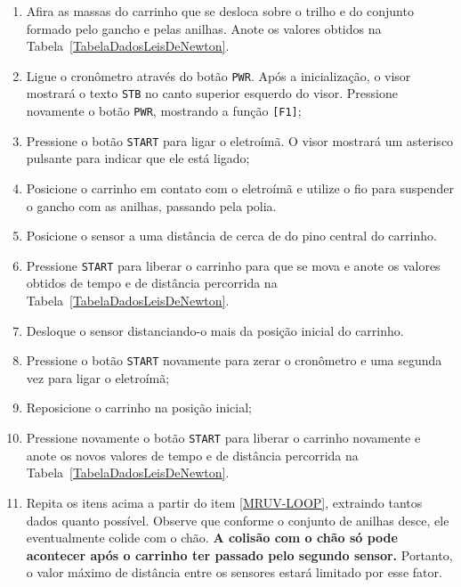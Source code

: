 \begin{enumerate}
	\item Afira as massas do carrinho que se desloca sobre o trilho e do conjunto formado pelo gancho e pelas anilhas. Anote os valores obtidos na Tabela~\ref{TabelaDadosLeisDeNewton}.
	    \item Ligue o cronômetro através do botão \texttt{PWR}. Após a inicialização, o visor mostrará o texto \texttt{STB} no canto superior esquerdo do visor. Pressione novamente o botão \texttt{PWR}, mostrando a função \texttt{[F1]};
    \item Pressione o botão \texttt{START} para ligar o eletroímã. O visor mostrará um asterisco pulsante para indicar que ele está ligado;
    \item Posicione o carrinho em contato com o eletroímã e utilize o fio para suspender o gancho com as anilhas, passando pela polia.
	\item Posicione o sensor a uma distância de cerca de  do pino central do carrinho.
	\item Pressione \texttt{START} para liberar o carrinho para que se mova e anote os valores obtidos de tempo e de distância percorrida na Tabela~\ref{TabelaDadosLeisDeNewton}.
	\item Desloque o sensor distanciando-o mais  da posição inicial do carrinho. \label{MRUV-LOOP}
	\item Pressione o botão \texttt{START} novamente para zerar o cronômetro e uma segunda vez para ligar o eletroímã;
	\item Reposicione o carrinho na posição inicial; 
	\item Pressione novamente o botão \texttt{START} para liberar o carrinho novamente e anote os novos valores de tempo e de distância percorrida na Tabela~\ref{TabelaDadosLeisDeNewton}.
	\item Repita os itens acima a partir do item \ref{MRUV-LOOP}, extraindo tantos dados quanto possível. Observe que conforme o conjunto de anilhas desce, ele eventualmente colide com o chão. \textbf{A colisão com o chão só pode acontecer após o carrinho ter passado pelo segundo sensor.} Portanto, o valor máximo de distância entre os sensores estará limitado por esse fator. 
\end{enumerate}

\cleardoublepage

